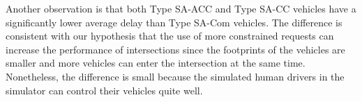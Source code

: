 
Another observation is that both Type SA-ACC and Type SA-CC vehicles
have a significantly lower average delay than Type SA-Com vehicles.
The difference is consistent with our hypothesis that the use of more
constrained requests can increase the performance of intersections
since the footprints of the vehicles are smaller and more vehicles can
enter the intersection at the same time.  Nonetheless, the difference
is small because the simulated human drivers in the simulator can
control their vehicles quite well.










